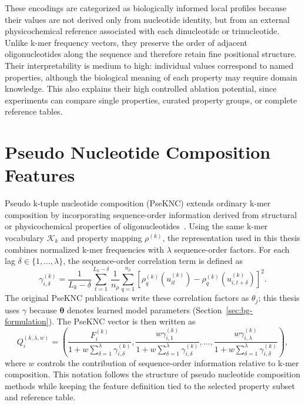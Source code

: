 These encodings are categorized as biologically informed local profiles because their values are not derived only from nucleotide identity, but from an external physicochemical reference associated with each dinucleotide or trinucleotide. Unlike k-mer frequency vectors, they preserve the order of adjacent oligonucleotides along the sequence and therefore retain fine positional structure. Their interpretability is medium to high: individual values correspond to named properties, although the biological meaning of each property may require domain knowledge. This also explains their high controlled ablation potential, since experiments can compare single properties, curated property groups, or complete reference tables.

\section{Pseudo Nucleotide Composition Features}\label{sec:features-pseknc}

Pseudo k-tuple nucleotide composition (PseKNC) extends ordinary k-mer composition by incorporating sequence-order information derived from structural or physicochemical properties of oligonucleotides~\citep{chen2014pseknc,chen2015psekncgeneral}. Using the same k-mer vocabulary $\mathcal{K}_k$ and property mapping $\rho^{(k)}$, the representation used in this thesis combines normalized k-mer frequencies with $\lambda$ sequence-order factors. For each lag $\delta\in\{1,\ldots,\lambda\}$, the sequence-order correlation term is defined as
\begin{equation}
\gamma_{i,\delta}^{(k)}=
\frac{1}{L_k-\delta}\sum_{t=1}^{L_k-\delta}
\frac{1}{n_\rho}\sum_{q=1}^{n_\rho}
\left[
\rho_q^{(k)}\left(u_{it}^{(k)}\right)-
\rho_q^{(k)}\left(u_{i,t+\delta}^{(k)}\right)
\right]^2.
\end{equation}
The original PseKNC publications write these correlation factors as $\theta_j$; this thesis uses $\gamma$ because $\boldsymbol{\theta}$ denotes learned model parameters (Section~\ref{sec:bg-formulation}).
The PseKNC vector is then written as
\begin{equation}
Q_i^{(k,\lambda,w)}=
\left(
\frac{F_i^{(k)}}{1+w\sum_{\delta=1}^{\lambda}\gamma_{i,\delta}^{(k)}},
\frac{w\gamma_{i,1}^{(k)}}{1+w\sum_{\delta=1}^{\lambda}\gamma_{i,\delta}^{(k)}},
\ldots,
\frac{w\gamma_{i,\lambda}^{(k)}}{1+w\sum_{\delta=1}^{\lambda}\gamma_{i,\delta}^{(k)}}
\right),
\end{equation}
where $w$ controls the contribution of sequence-order information relative to k-mer composition. This notation follows the structure of pseudo nucleotide composition methods while keeping the feature definition tied to the selected property subset and reference table.

